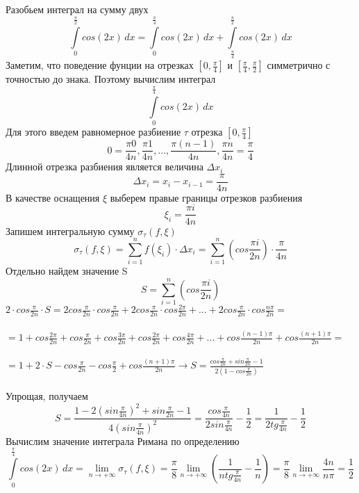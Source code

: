 \documentclass[a5paper, 10pt]{article}
\theoremstyle{definition}
\theoremstyle{plain}
\theoremstyle{remark}
\begin{document}
 Разобьем интеграл на сумму двух
\begin{equation}
\int\limits_0^\frac{\pi}{2} cos(2x) \,dx = \int\limits_0^\frac{\pi}{4} cos(2x) \,dx + \int\limits_\frac{\pi}{4}^\frac{\pi}{2} cos(2x) \,dx 
\end{equation}
Заметим, что поведение фунции на отрезках  $[0, \frac{\pi}{4}]$ и  $[ \frac{\pi}{4},\frac{\pi}{2} ]$ симметрично с точностью до знака. Поэтому вычислим интеграл
\begin{equation}
\int\limits_0^\frac{\pi}{4} cos(2x) \,dx
\end{equation}
Для этого введем равномерное разбиение $\tau$ отрезка $[0, \frac{\pi}{4}]$
\begin{equation}
0=\frac{\pi 0}{4 n}, \frac{\pi 1}{4 n}, ... , \frac{\pi (n - 1)}{4 n}, \frac{\pi n}{4 n}=\frac{\pi}{4 }
\end{equation}
Длинной отрезка разбиения является величина $\Delta x_i$ 
\begin{equation}
\Delta x_i = x_i - x_{i-1}= \frac{\pi}{4 n}
\end{equation}
В качестве оснащения $\xi$ выберем правые границы отрезков разбиения
\begin{equation}
\xi_i =\frac{\pi i}{4 n}
\end{equation}
Запишем интегральную сумму $\sigma_\tau (f, \xi)$
\begin{equation}
\sigma_\tau (f, \xi)= \sum\limits_{i=1}^n f(\xi_i) \cdot \Delta x_i = \sum\limits_{i=1}^n \left(cos\frac{\pi i}{2n}\right) \cdot \frac{\pi}{4 n}
\end{equation}
Отдельно найдем значение S
\begin{equation}
S = \sum\limits_{i=1}^n \left( cos\frac{\pi i}{2n}\right)
\end{equation}
$2 \cdot cos\frac{\pi}{2n} \cdot S = 2 cos\frac{\pi}{2n} \cdot cos\frac{\pi}{2n} + 2 cos\frac{\pi}{2n} \cdot cos\frac{2 \pi}{2n} + ... + 2 cos\frac{\pi}{2n} \cdot cos\frac{n\pi}{2n} = $ \\
 \\
 $ = 1 + cos\frac{2 \pi}{2n} + cos\frac{\pi}{2n} + cos\frac{3 \pi}{2n} + cos\frac{2 \pi}{2n} + cos\frac{4 \pi}{2n} + ... + cos\frac{(n-1) \pi}{2n} + cos\frac{(n+1) \pi}{2n}= $ \\
 \\
 $ = 1 + 2 \cdot S - cos\frac{\pi}{2n}-cos\frac{\pi}{2}+ cos\frac{(n+1)\pi}{2n} \rightarrow S =\frac{cos\frac{\pi}{2n}+ sin \frac{\pi}{2n} - 1}{2 \left(1 - cos\frac{\pi}{2n}\right)} $\\
\\
Упрощая, получаем
\begin{equation}
 S = \frac{1 - 2\left(sin\frac{\pi}{4n}\right)^2+ sin \frac{\pi}{2n} -1}{4 \left(sin\frac{\pi}{4n}\right)^2} = \frac{cos \frac{\pi}{4n}}{2 sin\frac{\pi}{4n}} - \frac{1}{2} = \frac{1}{2tg\frac{\pi}{4n}} - \frac{1}{2}
\end{equation}
Вычислим значение интеграла Римана по определению
\begin{equation}
\int\limits_0^\frac{\pi}{4} cos(2x) \,dx = \lim\limits_{n \to +\infty}  \sigma_{\tau} (f,  \xi) = \frac{\pi}{8}\lim\limits_{n \to +\infty} \left( \frac{1}{n tg\frac{\pi}{4n}} - \frac{1}{n} \right)= \frac{\pi}{8}\lim\limits_{n \to +\infty} \frac{4n}{n\pi} = \frac{1}{2}
\end{equation}
\end{document}
